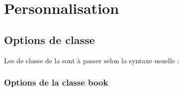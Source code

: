 \chapter{Personnalisation}\label{cha-configuration}


\section{Options de classe}\label{options-classe}

Les  de classe de la \yatCl{} sont à passer selon la syntaxe
usuelle :


\subsection{Options de la classe \textsf{book}}\label{sec-options-usuelles-de}

